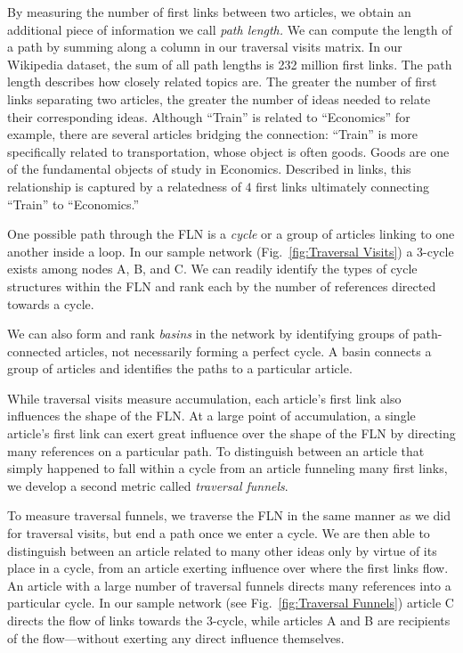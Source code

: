 \documentclass[11pt]{report}
\begin{document}
By measuring the number of first links between
two articles, we obtain an additional piece of information we call 
{\it path length.} We can compute the length of a path by summing 
along a column in our traversal visits matrix. 
In our Wikipedia dataset, the sum of all path lengths is 232 million first links.
The path length describes how closely related topics are.
The greater the number of first links separating two articles, the greater the number of ideas needed to relate their corresponding ideas. Although
``Train'' is related to ``Economics'' for example, there are several articles
bridging the connection:
``Train'' is more specifically related to transportation, whose object
is often goods. Goods are one of the fundamental objects of study in Economics.
Described in links, this relationship is captured by a relatedness of $4$ 
first links ultimately connecting ``Train'' to ``Economics.'' 

One possible path through the FLN is a {\it cycle} or a group of articles 
linking to one another inside a loop. In our sample network 
(Fig.~\ref{fig:Traversal Visits}) 
a 3-cycle exists among nodes A, B, and C. 
We can readily identify
the types of cycle structures within the FLN
and rank each by 
the number of references directed towards a cycle. 


We can also form and rank {\it basins} in the network by identifying groups of 
path-connected articles, not necessarily forming a perfect cycle.
A basin connects a group of articles and identifies the paths 
to a particular article.

While traversal visits measure accumulation, each article's first link also 
influences the shape of the FLN. 
At a large point of accumulation, a single article's first link 
can exert great influence over the shape of the FLN by directing many
references on a particular path. To distinguish between an article 
that simply happened to fall within a cycle from an article funneling 
many first links, we develop a second metric called {\it traversal funnels}.

To measure traversal funnels, we traverse the FLN in the same manner as we 
did for traversal visits, but end a path once we enter a cycle.
We are then able to distinguish between an article related to many other ideas
only by virtue of its place in a cycle, from an article exerting influence over where the first links flow. 
An article with a large number of traversal funnels directs many references
into a particular cycle. In our sample network 
(see Fig.~\ref{fig:Traversal Funnels}) article C 
directs the flow of links towards the 3-cycle, while articles A and B are 
recipients of the flow---without exerting any direct influence themselves. 
\end{document}
